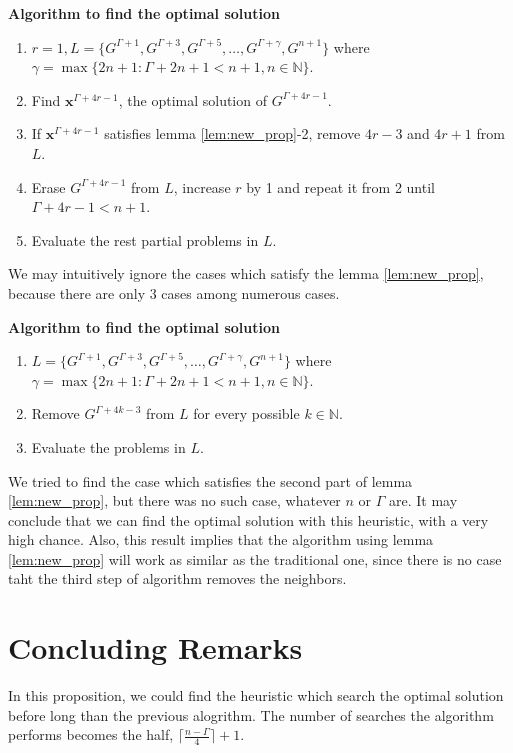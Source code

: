 \documentclass[letterpaper, 10pt]{article}
\renewcommand{\vec}[1]{\bm{#1}}
\begin{document}
\textbf{Algorithm to find the optimal solution}
\begin{enumerate}
	\item $r=1, L = \{ G^{\Gamma + 1}, G^{\Gamma + 3}, G^{\Gamma + 5}, \ldots, G^{\Gamma + \gamma}, G^{n+1} \}$ where $\gamma = \max\{{2n+1 : \Gamma + 2n + 1 < n+1, n \in \mathbb{N}} \}$.
	\item Find $\vec{x}^{\Gamma + 4r - 1}$, the optimal solution of $G^{\Gamma + 4r - 1}$.
	\item If $\vec{x}^{\Gamma + 4r - 1}$ satisfies lemma \ref{lem:new_prop}-2, remove $4r-3$ and $4r+1$ from $L$.
	\item Erase $G^{\Gamma + 4r - 1}$ from $L$, increase $r$ by 1 and repeat it from 2 until $\Gamma + 4r-1 < n+1$.
	\item Evaluate the rest partial problems in $L$.
\end{enumerate}
We may intuitively ignore the cases which satisfy the lemma \ref{lem:new_prop}, because there are only 3 cases among numerous cases.

\textbf{Algorithm to find the optimal solution}
\begin{enumerate}
	\item $L = \{ G^{\Gamma + 1}, G^{\Gamma + 3}, G^{\Gamma + 5}, \ldots, G^{\Gamma + \gamma}, G^{n+1} \}$ where $\gamma = \max\{{2n+1 : \Gamma + 2n + 1 < n+1, n \in \mathbb{N}} \}$.
	\item Remove $G^{\Gamma + 4k - 3}$ from $L$ for every possible $k \in \mathbb{N}$.
	\item Evaluate the problems in $L$.
\end{enumerate}
We tried to find the case which satisfies the second part of lemma \ref{lem:new_prop}, but there was no such case, whatever $n$ or $\Gamma$ are.
It may conclude that we can find the optimal solution with this heuristic, with a very high chance.
Also, this result implies that the algorithm using lemma \ref{lem:new_prop} will work as similar as the traditional one,
since there is no case taht the third step of algorithm removes the neighbors.

\section{Concluding Remarks}
In this proposition, we could find the heuristic which search the optimal solution before long than the previous alogrithm.
The number of searches the algorithm performs becomes the half, $\lceil \frac{n - \Gamma}{4} \rceil + 1$.





%


\end{document}
